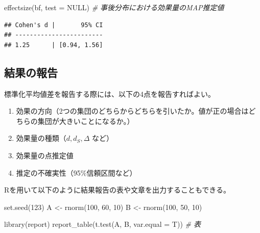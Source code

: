 \documentclass[
  ja=standard, xelatex, base=12pt]{bxjsreport}
\newenvironment{Shaded}{\begin{snugshade}}{\end{snugshade}}
\newcommand{\AttributeTok}[1]{\textcolor[rgb]{0.77,0.63,0.00}{#1}}
\newcommand{\CommentTok}[1]{\textcolor[rgb]{0.56,0.35,0.01}{\textit{#1}}}
\newcommand{\ConstantTok}[1]{\textcolor[rgb]{0.00,0.00,0.00}{#1}}
\newcommand{\DecValTok}[1]{\textcolor[rgb]{0.00,0.00,0.81}{#1}}
\newcommand{\FunctionTok}[1]{\textcolor[rgb]{0.00,0.00,0.00}{#1}}
\newcommand{\NormalTok}[1]{#1}
\newcommand{\OtherTok}[1]{\textcolor[rgb]{0.56,0.35,0.01}{#1}}
\providecommand{\tightlist}{%
  \setlength{\itemsep}{0pt}\setlength{\parskip}{0pt}}
\begin{document}
\begin{Shaded}
\begin{Highlighting}[]
\FunctionTok{effectsize}\NormalTok{(bf, }\AttributeTok{test =} \ConstantTok{NULL}\NormalTok{) }\CommentTok{\# 事後分布における効果量のMAP推定値}
\end{Highlighting}
\end{Shaded}

\begin{verbatim}
## Cohen's d |       95% CI
## ------------------------
## 1.25      | [0.94, 1.56]
\end{verbatim}

\hypertarget{ux7d50ux679cux306eux5831ux544a-3}{%
\subsection{結果の報告}\label{ux7d50ux679cux306eux5831ux544a-3}}

標準化平均値差を報告する際には、以下の4点を報告すればよい。

\begin{enumerate}
\def\labelenumi{\arabic{enumi}.}
\tightlist
\item
  効果の方向（2つの集団のどちらからどちらを引いたか。値が正の場合はどちらの集団が大きいことになるか。）
\item
  効果量の種類（\(d, d_S, \Delta\) など）
\item
  効果量の点推定値
\item
  推定の不確実性（95\%信頼区間など）
\end{enumerate}

Rを用いて以下のように結果報告の表や文章を出力することもできる。

\begin{Shaded}
\begin{Highlighting}[]
\FunctionTok{set.seed}\NormalTok{(}\DecValTok{123}\NormalTok{)}
\NormalTok{A }\OtherTok{\textless{}{-}} \FunctionTok{rnorm}\NormalTok{(}\DecValTok{100}\NormalTok{, }\DecValTok{60}\NormalTok{, }\DecValTok{10}\NormalTok{)}
\NormalTok{B }\OtherTok{\textless{}{-}} \FunctionTok{rnorm}\NormalTok{(}\DecValTok{100}\NormalTok{, }\DecValTok{50}\NormalTok{, }\DecValTok{10}\NormalTok{)}

\FunctionTok{library}\NormalTok{(report)}
\FunctionTok{report\_table}\NormalTok{(}\FunctionTok{t.test}\NormalTok{(A, B, }\AttributeTok{var.equal =}\NormalTok{ T)) }\CommentTok{\# 表}
\end{Highlighting}
\end{Shaded}
\end{document}
